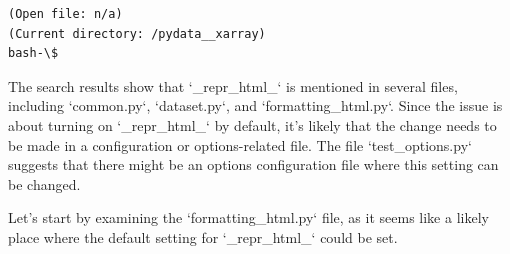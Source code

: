 {\begin{observationbox}
\begin{Verbatim}[breaklines=true, breakanywhere=true]
(Open file: n/a)
(Current directory: /pydata__xarray)
bash-\$
\end{Verbatim}
\end{observationbox}
\begin{agentbox}
The search results show that `\_repr\_html\_` is mentioned in several files, including `common.py`, `dataset.py`, and `formatting\_html.py`. Since the issue is about turning on `\_repr\_html\_` by default, it's likely that the change needs to be made in a configuration or options-related file. The file `test\_options.py` suggests that there might be an options configuration file where this setting can be changed.



Let's start by examining the `formatting\_html.py` file, as it seems like a likely place where the default setting for `\_repr\_html\_` could be set.




\end{agentbox}}
